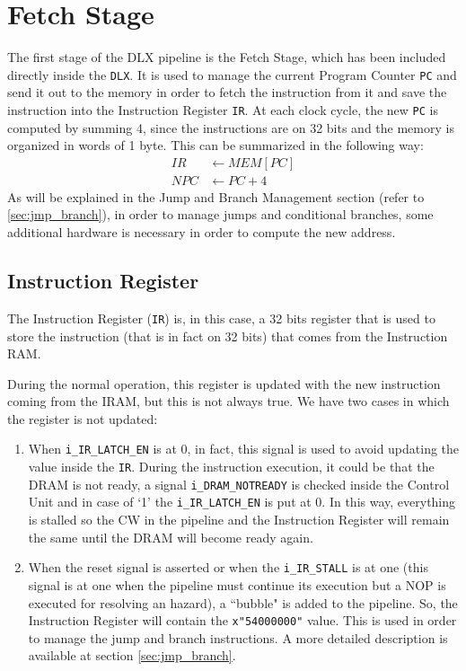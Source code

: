 \chapter{Fetch Stage}
The first stage of the DLX pipeline is the Fetch Stage, which has been included directly inside the \texttt{DLX}. It is used to manage the current Program Counter \texttt{PC} and send it out to the memory in order to fetch the instruction from it and save the instruction into the Instruction Register \texttt{IR}. At each clock cycle, the new \texttt{PC} is computed by summing 4, since the instructions are on 32 bits and the memory is organized in words of 1 byte. This can be summarized in the following way:
\begin{align*}
	IR &\leftarrow MEM[PC]\\
	NPC &\leftarrow PC + 4
\end{align*}
As will be explained in the Jump and Branch Management section (refer to \ref{sec:jmp_branch}), in order to manage jumps and conditional branches, some additional hardware is necessary in order to compute the new address.

\section{Instruction Register}
The Instruction Register (\texttt{IR}) is, in this case, a 32 bits register that is used to store the instruction (that is in fact on 32 bits) that comes from the Instruction RAM.

During the normal operation, this register is updated with the new instruction coming from the IRAM, but this is not always true. We have two cases in which the register is not updated:
\begin{enumerate}
	\item When \texttt{i\_IR\_LATCH\_EN} is at 0, in fact, this signal is used to avoid updating the value inside the \texttt{IR}. During the instruction execution, it could be that the DRAM is not ready, a signal \texttt{i\_DRAM\_NOTREADY} is checked inside the Control Unit and in case of `1' the \texttt{i\_IR\_LATCH\_EN} is put at 0. In this way, everything is stalled so the CW in the pipeline and the Instruction Register will remain the same until the DRAM will become ready again. 
	\item When the reset signal is asserted or when the \texttt{i\_IR\_STALL} is at one (this signal is at one when the pipeline must continue its execution but a NOP is executed for resolving an hazard), a ``bubble" is added to the pipeline. So, the Instruction Register will contain the \texttt{x"54000000"} value. This is used in order to manage the jump and branch instructions. A more detailed description is available at section \ref{sec:jmp_branch}.
\end{enumerate}

